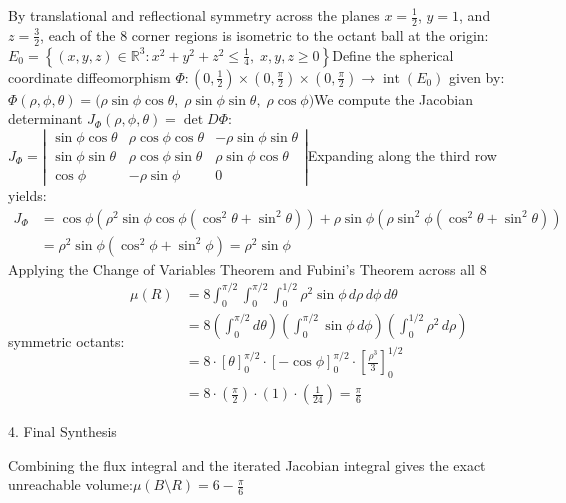 \begin{enumerate}
 By translational and reflectional symmetry across the planes \(x = \frac{1}{2}\), \(y = 1\), and \(z = \frac{3}{2}\), each of the \(8\) corner regions is isometric to the octant ball at the origin:\(E_{0}=\left\{(x,y,z)\in \mathbb{R}^{3}:x^{2}+y^{2}+z^{2}\le \frac{1}{4},\;x,y,z\ge 0\right\}\)Define the spherical coordinate diffeomorphism \(\Phi: \left(0, \frac{1}{2}\right) \times \left(0, \frac{\pi}{2}\right) \times \left(0, \frac{\pi}{2}\right) \to \operatorname{int}(E_0)\) given by:\(\Phi (\rho ,\phi ,\theta )=\big(\rho \sin \phi \cos \theta ,\;\rho \sin \phi \sin \theta ,\;\rho \cos \phi \big)\)We compute the Jacobian determinant \(J_\Phi(\rho, \phi, \theta) = \det D\Phi\):\(J_{\Phi }=\left|\begin{matrix}\sin \phi \cos \theta &\rho \cos \phi \cos \theta &-\rho \sin \phi \sin \theta \\ \sin \phi \sin \theta &\rho \cos \phi \sin \theta &\rho \sin \phi \cos \theta \\ \cos \phi &-\rho \sin \phi &0\end{matrix}\right|\)Expanding along the third row yields:\(\begin{aligned}J_{\Phi }&=\cos \phi \left(\rho ^{2}\sin \phi \cos \phi (\cos ^{2}\theta +\sin ^{2}\theta )\right)+\rho \sin \phi \left(\rho \sin ^{2}\phi (\cos ^{2}\theta +\sin ^{2}\theta )\right)\\ &=\rho ^{2}\sin \phi (\cos ^{2}\phi +\sin ^{2}\phi )=\rho ^{2}\sin \phi \end{aligned}\)Applying the Change of Variables Theorem and Fubini's Theorem across all \(8\) symmetric octants:\(\begin{aligned}\mu (R)&=8\int _{0}^{\pi /2}\int _{0}^{\pi /2}\int _{0}^{1/2}\rho ^{2}\sin \phi \,d\rho \,d\phi \,d\theta \\ &=8\left(\int _{0}^{\pi /2}d\theta \right)\left(\int _{0}^{\pi /2}\sin \phi \,d\phi \right)\left(\int _{0}^{1/2}\rho ^{2}\,d\rho \right)\\ &=8\cdot \left[\theta \right]_{0}^{\pi /2}\cdot \left[-\cos \phi \right]_{0}^{\pi /2}\cdot \left[\frac{\rho ^{3}}{3}\right]_{0}^{1/2}\\ &=8\cdot \left(\frac{\pi }{2}\right)\cdot (1)\cdot \left(\frac{1}{24}\right)=\frac{\pi }{6}\end{aligned}\)

 4. Final Synthesis

 Combining the flux integral and the iterated Jacobian integral gives the exact unreachable volume:\(\mu (B\setminus R)=6-\frac{\pi }{6}\)


\end{enumerate}
